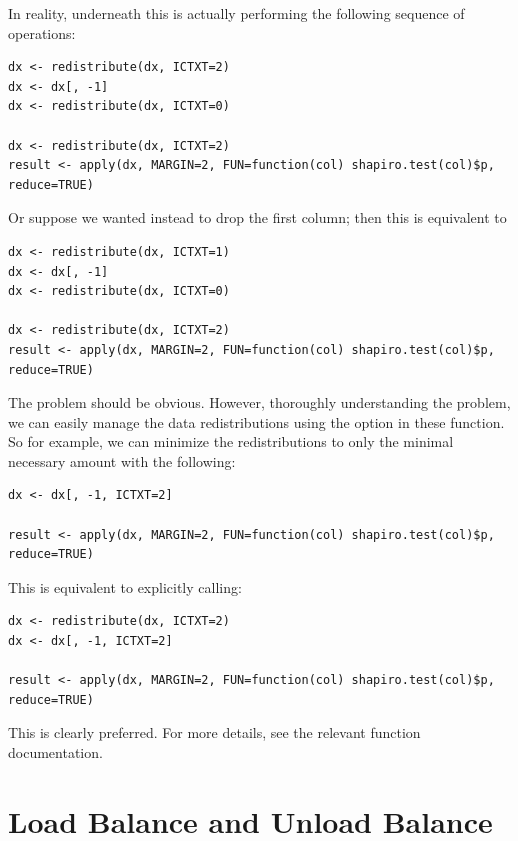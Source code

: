 In reality, underneath this is actually performing the following sequence of operations:

\begin{lstlisting}[language=rr,title=Implicit Redistributions]
dx <- redistribute(dx, ICTXT=2)
dx <- dx[, -1]
dx <- redistribute(dx, ICTXT=0)

dx <- redistribute(dx, ICTXT=2)
result <- apply(dx, MARGIN=2, FUN=function(col) shapiro.test(col)$p, reduce=TRUE)
\end{lstlisting}

Or suppose we wanted instead to drop the first column; then this is equivalent to

\begin{lstlisting}[language=rr,title=Implicit Redistributions]
dx <- redistribute(dx, ICTXT=1)
dx <- dx[, -1]
dx <- redistribute(dx, ICTXT=0)

dx <- redistribute(dx, ICTXT=2)
result <- apply(dx, MARGIN=2, FUN=function(col) shapiro.test(col)$p, reduce=TRUE)
\end{lstlisting}

The problem should be obvious.  However, thoroughly understanding the problem, 
we can easily manage the data redistributions using the  option in 
these function.  So for example, we can minimize the redistributions to only the 
minimal necessary amount with the following:

\begin{lstlisting}[language=rr,title=Implicit Redistributions]
dx <- dx[, -1, ICTXT=2]

result <- apply(dx, MARGIN=2, FUN=function(col) shapiro.test(col)$p, reduce=TRUE)
\end{lstlisting}

This is equivalent to explicitly calling:

\begin{lstlisting}[language=rr,title=Implicit Redistributions]
dx <- redistribute(dx, ICTXT=2)
dx <- dx[, -1, ICTXT=2]

result <- apply(dx, MARGIN=2, FUN=function(col) shapiro.test(col)$p, reduce=TRUE)
\end{lstlisting}

This is clearly preferred.  For more details, see the relevant function documentation.




\section[Load Balance and Unload Balance]{Load Balance and Unload Balance}
\label{sec:lb_ub}

